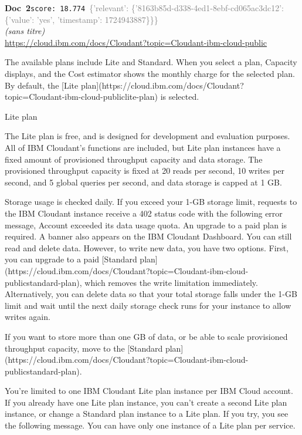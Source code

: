 \documentclass[a4paper,11pt]{article}
\begin{document}
\begin{docenv}
{\footnotesize\textcolor{doccolor}{\textbf{Doc~2}}}\hfill{\tiny\texttt{score:~18.774}}\ {\tiny\textcolor{gray}{\{'relevant': \{'8163b85d-d338-4ed1-8ebf-cd065ac3dc12': \{'value': 'yes', 'timestamp': 1724943887\}\}\}}}\\[3pt]
{\small\textit{(sans titre)}}\\[2pt]
{\tiny\url{https://cloud.ibm.com/docs/Cloudant?topic=Cloudant-ibm-cloud-public}}\\[4pt]
{\footnotesize 
The available plans include Lite and Standard. When you select a plan, Capacity displays, and the Cost estimator shows the monthly charge for the selected plan. By default, the [Lite plan](https://cloud.ibm.com/docs/Cloudant?topic=Cloudant-ibm-cloud-publiclite-plan) is selected.



 Lite plan 

The Lite plan is free, and is designed for development and evaluation purposes. All of IBM Cloudant's functions are included, but Lite plan instances have a fixed amount of provisioned throughput capacity and data storage. The provisioned throughput capacity is fixed at 20 reads per second, 10 writes per second, and 5 global queries per second, and data storage is capped at 1 GB.

Storage usage is checked daily. If you exceed your 1-GB storage limit, requests to the IBM Cloudant instance receive a 402 status code with the following error message, Account exceeded its data usage quota. An upgrade to a paid plan is required. A banner also appears on the IBM Cloudant Dashboard. You can still read and delete data. However, to write new data, you have two options. First, you can upgrade to a paid [Standard plan](https://cloud.ibm.com/docs/Cloudant?topic=Cloudant-ibm-cloud-publicstandard-plan), which removes the write limitation immediately. Alternatively, you can delete data so that your total storage falls under the 1-GB limit and wait until the next daily storage check runs for your instance to allow writes again.

If you want to store more than one GB of data, or be able to scale provisioned throughput capacity, move to the [Standard plan](https://cloud.ibm.com/docs/Cloudant?topic=Cloudant-ibm-cloud-publicstandard-plan).

You're limited to one IBM Cloudant Lite plan instance per IBM Cloud account. If you already have one Lite plan instance, you can't create a second Lite plan instance, or change a Standard plan instance to a Lite plan. If you try, you see the following message. You can have only one instance of a Lite plan per service.}
\end{docenv}
\end{document}
